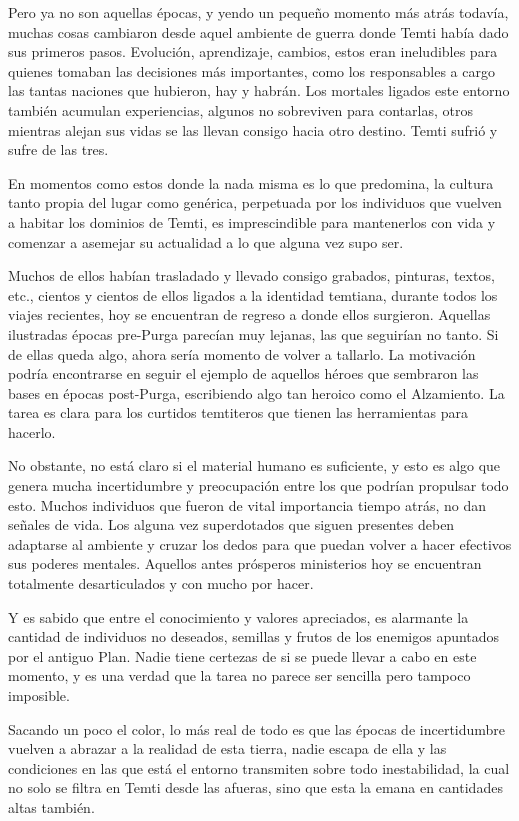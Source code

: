 \documentclass[
  spanish,
]{book}
\begin{document}
Pero ya no son aquellas épocas, y yendo un pequeño momento más atrás todavía, muchas cosas cambiaron desde aquel ambiente de guerra donde Temti había dado sus primeros pasos. Evolución, aprendizaje, cambios, estos eran ineludibles para quienes tomaban las decisiones más importantes, como los responsables a cargo las tantas naciones que hubieron, hay y habrán. Los mortales ligados este entorno también acumulan experiencias, algunos no sobreviven para contarlas, otros mientras alejan sus vidas se las llevan consigo hacia otro destino. Temti sufrió y sufre de las tres.

En momentos como estos donde la nada misma es lo que predomina, la cultura tanto propia del lugar como genérica, perpetuada por los individuos que vuelven a habitar los dominios de Temti, es imprescindible para mantenerlos con vida y comenzar a asemejar su actualidad a lo que alguna vez supo ser.

Muchos de ellos habían trasladado y llevado consigo grabados, pinturas, textos, etc., cientos y cientos de ellos ligados a la identidad temtiana, durante todos los viajes recientes, hoy se encuentran de regreso a donde ellos surgieron. Aquellas ilustradas épocas pre-Purga parecían muy lejanas, las que seguirían no tanto. Si de ellas queda algo, ahora sería momento de volver a tallarlo. La motivación podría encontrarse en seguir el ejemplo de aquellos héroes que sembraron las bases en épocas post-Purga, escribiendo algo tan heroico como el Alzamiento. La tarea es clara para los curtidos temtiteros que tienen las herramientas para hacerlo.

No obstante, no está claro si el material humano es suficiente, y esto es algo que genera mucha incertidumbre y preocupación entre los que podrían propulsar todo esto. Muchos individuos que fueron de vital importancia tiempo atrás, no dan señales de vida. Los alguna vez superdotados que siguen presentes deben adaptarse al ambiente y cruzar los dedos para que puedan volver a hacer efectivos sus poderes mentales. Aquellos antes prósperos ministerios hoy se encuentran totalmente desarticulados y con mucho por hacer.

Y es sabido que entre el conocimiento y valores apreciados, es alarmante la cantidad de individuos no deseados, semillas y frutos de los enemigos apuntados por el antiguo Plan.
Nadie tiene certezas de si se puede llevar a cabo en este momento, y es una verdad que la tarea no parece ser sencilla pero tampoco imposible.

Sacando un poco el color, lo más real de todo es que las épocas de incertidumbre vuelven a abrazar a la realidad de esta tierra, nadie escapa de ella y las condiciones en las que está el entorno transmiten sobre todo inestabilidad, la cual no solo se filtra en Temti desde las afueras, sino que esta la emana en cantidades altas también.
\end{document}
